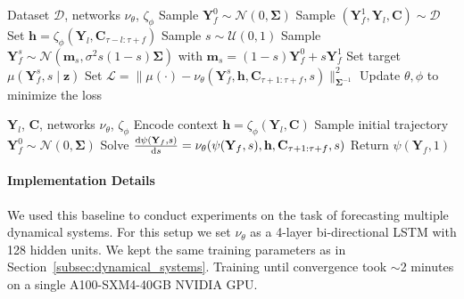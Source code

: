\documentclass[preprint,12pt,authoryear]{elsarticle}
\begin{document}
\begin{algorithm}[t]
\caption{FM training.}
\begin{small}
\begin{algorithmic}[1]
\Require Dataset $\mathcal{D}$, networks $\nu_\theta$, $\zeta_\phi$
    \State Sample $\mathbf{Y}_f^0 \sim \mathcal{N}(0,\mathbf{\Sigma})$ \State Sample $(\mathbf{Y}_f^1,\mathbf{Y}_l,\mathbf{C}) \sim \mathcal{D}$
    \State Set $\mathbf{h} = \zeta_\phi(\mathbf{Y}_l, \mathbf{C}_{\tau-l:\tau+f})$
    \State Sample $s\sim\mathcal{U}(0,1)$
    \State Sample $\mathbf{Y}_f^s \sim \mathcal{N}\left(\mathbf{m}_s, \sigma^2 s(1-s)\mathbf{\Sigma}\right)$ with $\mathbf{m}_s = (1-s)\mathbf{Y}_f^0 + s\mathbf{Y}_f^1$
    \State Set target $\mu(\mathbf{Y}_f^s,s\mid\mathbf{z})$
    \State Set $\mathcal{L} = \|\mu(\cdot) - \nu_\theta(\mathbf{Y}_f^s, \mathbf{h}, \mathbf{C}_{\tau+1:\tau+f}, s)\|^2_{\mathbf{\Sigma}^{-1}}$
    \State Update $\theta,\phi$ to minimize the loss
\EndWhile
\end{algorithmic}
\end{small}
\label{tab:fmtrain}
\end{algorithm}

\begin{algorithm}[t]
\caption{FM inference.}
\begin{small}
\begin{algorithmic}[1]
\Require $\mathbf{Y}_l$, $\mathbf{C}$, networks $\nu_\theta$, $\zeta_\phi$
\State Encode context $\mathbf{h} = \zeta_\phi(\mathbf{Y}_l, \mathbf{C})$
\State Sample initial trajectory $\mathbf{Y}_f^0 \sim \mathcal{N}(0,\mathbf{\Sigma})$
\State Solve $\dv{\psi(\mathbf{Y}_f,s)}{s} = \nu_\theta(\psi(\mathbf{Y}_f,s), \mathbf{h}, \mathbf{C}_{\tau+1:\tau+f}, s)$
\State Return $\psi(\mathbf{Y}_f,1)$
\end{algorithmic}
\end{small}
\label{tab:fminfer}
\end{algorithm}


\paragraph{Implementation Details}
We used this baseline to conduct experiments on the task of forecasting multiple dynamical systems. For this setup we set $\nu_\theta$ as a 4-layer bi-directional LSTM with 128 hidden units. We kept the same training parameters as in Section~\ref{subsec:dynamical_systems}. Training until convergence took $\sim$2 minutes on a single A100-SXM4-40GB NVIDIA GPU. 
\end{document}
